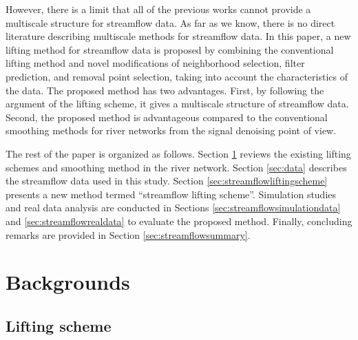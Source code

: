 \documentclass[11pt,titlepage]{article}
\begin{document}
However, there is a limit that all of the previous works cannot provide a multiscale structure for streamflow data. As far as we know, there is no direct literature describing multiscale methods for streamflow data. In this paper, a new lifting method for streamflow data is proposed by combining the conventional lifting method and novel modifications of neighborhood selection, filter prediction, and removal point selection, taking into account the characteristics of the data. The proposed method has two advantages. First, by following the argument of the lifting scheme, it gives a multiscale structure of streamflow data. Second, the proposed method is advantageous compared to the conventional smoothing methods for river networks from the signal denoising point of view.

The rest of the paper is organized as follows. Section \ref{sec:lifting} reviews the existing lifting schemes and smoothing method in the river network. Section \ref{sec:data} describes the streamflow data used in this study. Section \ref{sec:streamflowliftingscheme} presents a new method termed ``streamflow lifting scheme''. Simulation studies and real data analysis are conducted in Sections \ref{sec:streamflowsimulationdata} and \ref{sec:streamflowrealdata} to evaluate the proposed method. Finally, concluding remarks are provided in Section \ref{sec:streamflowsummary}.

\section{Backgrounds}\label{sec:lifting}

\subsection{Lifting scheme}
\end{document}
